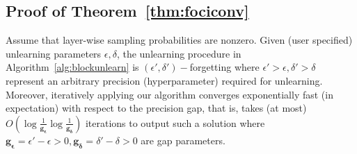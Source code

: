 \subsection{Proof of Theorem~\ref{thm:fociconv}}
\begin{theorem}
Assume that layer-wise sampling probabilities are nonzero. Given (user specified) unlearning parameters $\epsilon,\delta$, the unlearning procedure in Algorithm~\ref{alg:blockunlearn} is $(\epsilon',\delta')-$forgetting where $\epsilon'>\epsilon,\delta'>\delta$ represent an arbitrary  precision (hyperparameter) required for unlearning. Moreover, iteratively applying our algorithm converges exponentially fast (in expectation) with respect to the precision gap, that is, takes (at most) $O(\log\frac{1}{\mathbf{g_{\epsilon}}}\log\frac{1}{\mathbf{g_{\delta}}})$ iterations to output such a solution where  $\mathbf{g_{\epsilon}} = \epsilon'-\epsilon>0,\mathbf{g_{\delta}}=\delta'-\delta>0$ are gap parameters.
\end{theorem}
